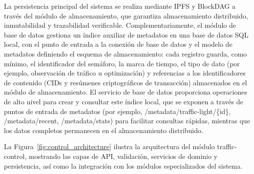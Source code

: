 La persistencia principal del sistema se realiza mediante IPFS y BlockDAG a través del módulo de almacenamiento, que garantiza almacenamiento distribuido, inmutabilidad y trazabilidad verificable. Complementariamente, el módulo de base de datos gestiona un índice auxiliar de metadatos en una base de datos SQL local, con el punto de entrada a la conexión de base de datos y el modelo de metadatos definiendo el esquema de almacenamiento: cada registro guarda, como mínimo, el identificador del semáforo, la marca de tiempo, el tipo de dato (por ejemplo, observación de tráfico u optimización) y referencias a los identificadores de contenido (CIDs y resúmenes criptográficos de transacción) almacenados en el módulo de almacenamiento. El servicio de base de datos proporciona operaciones de alto nivel para crear y consultar este índice local, que se exponen a través de puntos de entrada de metadatos (por ejemplo, /metadata/traffic-light/\{id\}, /metadata/recent, /metadata/stats) para facilitar consultas rápidas, mientras que los datos completos permanecen en el almacenamiento distribuido.

La Figura~\ref{fig:control_architecture} ilustra la arquitectura del módulo traffic-control, mostrando las capas de API, validación, servicios de dominio y persistencia, así como la integración con los módulos especializados del sistema.

